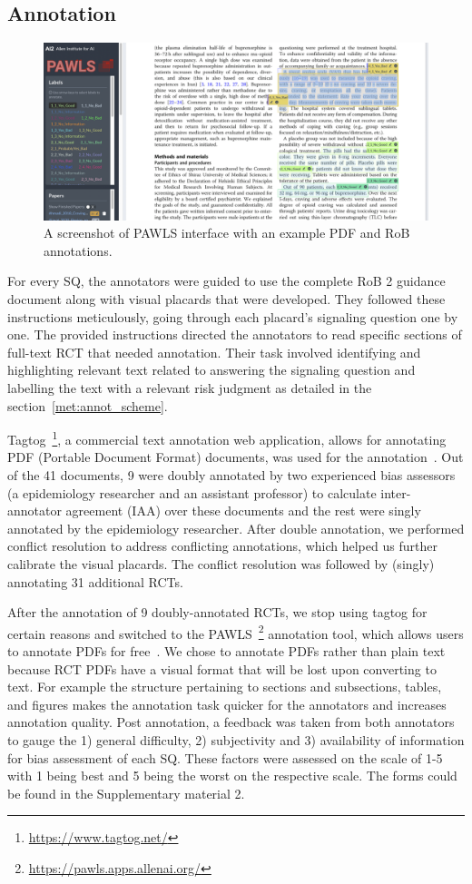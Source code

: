 \documentclass[sn-mathphys,Numbered]{sn-jnl}%
\theoremstyle{thmstyleone}%
\theoremstyle{thmstyletwo}%
\theoremstyle{thmstylethree}%
\begin{document}
\subsection{Annotation}
\label{annotation}
%
%
%
%
\begin{figure}[htb]
    \centering
    \includegraphics[width=0.80\columnwidth]{figures/pawls_layout.png}
    \caption{A screenshot of PAWLS interface with an example PDF and RoB annotations.}
    \label{fig:pawls}
\end{figure}
%
%
%
For every SQ, the annotators were guided to use the complete RoB 2 guidance document along with visual placards that were developed.
They followed these instructions meticulously, going through each placard's signaling question one by one.
The provided instructions directed the annotators to read specific sections of full-text RCT that needed annotation.
Their task involved identifying and highlighting relevant text related to answering the signaling question and labelling the text with a relevant risk judgment as detailed in the section~\ref{met:annot_scheme}.



Tagtog~\footnote{\url{https://www.tagtog.net/}}, a commercial text annotation web application, allows for annotating PDF (Portable Document Format) documents, was used for the annotation~\cite{cejuela2014tagtog}.
Out of the 41 documents, 9 were doubly annotated by two experienced bias assessors (a epidemiology researcher and an assistant professor) to calculate inter-annotator agreement (IAA) over these documents and the rest were singly annotated by the epidemiology researcher.
After double annotation, we performed conflict resolution to address conflicting annotations, which helped us further calibrate the visual placards.
The conflict resolution was followed by (singly) annotating 31 additional RCTs.



After the annotation of 9 doubly-annotated RCTs, we stop using tagtog for certain reasons and switched to the PAWLS~\footnote{\url{https://pawls.apps.allenai.org/}} annotation tool, which allows users to annotate PDFs for free~\cite{neumann2021pawls}.
We chose to annotate PDFs rather than plain text because RCT PDFs have a visual format that will be lost upon converting to text. 
For example the structure pertaining to sections and subsections, tables, and figures makes the annotation task quicker for the annotators and increases annotation quality.
Post annotation, a feedback was taken from both annotators to gauge the 1) general difficulty, 2) subjectivity and 3) availability of information for bias assessment of each SQ.
These factors were assessed on the scale of 1-5 with 1 being best and 5 being the worst on the respective scale.
The forms could be found in the Supplementary material 2.
%
%
%
\end{document}
